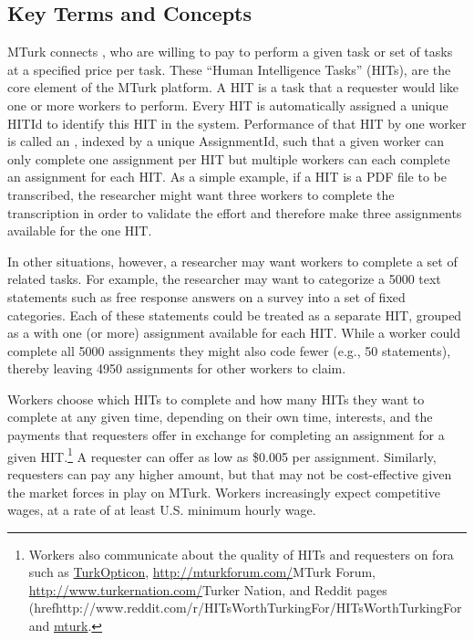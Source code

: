 \subsection{Key Terms and Concepts}
MTurk connects , who are willing to pay  to perform a given task or set of tasks at a specified price per task. These ``Human Intelligence Tasks'' (HITs), are the core element of the MTurk platform. A HIT is a task that a requester would like one or more workers to perform. Every HIT is automatically assigned a unique HITId to identify this HIT in the system. Performance of that HIT by one worker is called an , indexed by a unique AssignmentId, such that a given worker can only complete one assignment per HIT but multiple workers can each complete an assignment for each HIT. As a simple example, if a HIT is a PDF file to be transcribed, the researcher might want three workers to complete the transcription in order to validate the effort and therefore make three assignments available for the one HIT.

In other situations, however, a researcher may want workers to complete a set of related tasks. For example, the researcher may want to categorize a 5000 text statements such as free response answers on a survey into a set of fixed categories. Each of these statements could be treated as a separate HIT, grouped as a  with one (or more) assignment available for each HIT. While a worker could complete all 5000 assignments they might also code fewer (e.g., 50 statements), thereby leaving 4950 assignments for other workers to claim.

Workers choose which HITs to complete and how many HITs they want to complete at any given time, depending on their own time, interests, and the payments that requesters offer in exchange for completing an assignment for a given HIT.\footnote{Workers also communicate about the quality of HITs and requesters on fora such as \href{http://turkopticon.differenceengines.com/}{TurkOpticon}, \url{http://mturkforum.com/}{MTurk Forum}, \url{http://www.turkernation.com/}{Turker Nation}, and Reddit pages (href{http://www.reddit.com/r/HITsWorthTurkingFor/}{HITsWorthTurkingFor} and \href{http://www.reddit.com/r/mturk}{mturk}.} A requester can offer as low as \$0.005 per assignment. Similarly, requesters can pay any higher amount, but that may not be cost-effective given the market forces in play on MTurk. Workers increasingly expect competitive wages, at a rate of at least U.S. minimum hourly wage.

